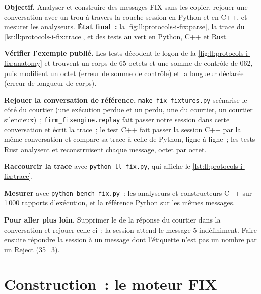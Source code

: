 \begin{tutorial}
\textbf{Objectif.} Analyser et construire des messages FIX sans les copier, rejouer une conversation avec un trou à travers la couche session
en Python et en C++, et mesurer les analyseurs. \textbf{État final~:} la \cref{fig:ll:protocols-i-fix:parse}, la trace du
\cref{lst:ll:protocols-i-fix:trace}, et des tests au vert en Python, C++ et Rust.
\begin{tutsteps}
\item \textbf{Vérifier l'exemple publié.} Les tests décodent le logon de la \cref{fig:ll:protocols-i-fix:anatomy} et trouvent un
corps de 65 octets et une somme de contrôle de 062, puis modifient un octet (erreur de somme de contrôle) et la longueur déclarée (erreur de longueur de corps).
\item \textbf{Rejouer la conversation de référence.} \texttt{make\_fix\_fixtures.py} scénarise le côté du courtier (une exécution perdue et un
 perdu, une  du courtier, un courtier silencieux)~; \texttt{firm\_fixengine.replay} fait passer notre session dans cette conversation
et écrit la trace~; le test C++ fait passer la session C++ par la même conversation et compare sa trace à celle de Python,
ligne à ligne~; les tests Rust analysent et reconstruisent chaque message, octet par octet.
\item \textbf{Raccourcir la trace} avec \texttt{python ll\_fix.py}, qui affiche le \cref{lst:ll:protocols-i-fix:trace}.
\item \textbf{Mesurer} avec \texttt{python bench\_fix.py}~: les analyseurs et constructeurs C++ sur 1\,000 rapports d'exécution,
et la référence Python sur les mêmes messages.
\end{tutsteps}
\textbf{Pour aller plus loin.} Supprimer le  de la réponse du courtier dans la conversation et rejouer celle-ci~: la session
attend le message 5 indéfiniment. Faire ensuite répondre la session à un message dont l'étiquette n'est pas un nombre par un Reject (35=3).
\end{tutorial}

\section{Construction~: le moteur FIX}\label{bld:ll:protocols-i-fix:fixengine}

